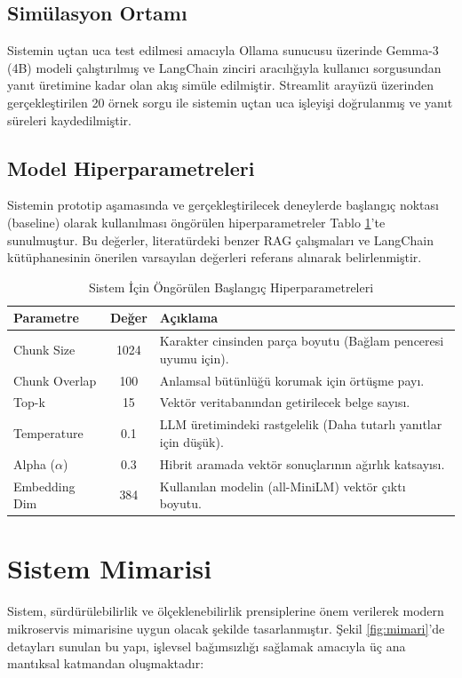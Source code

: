 \documentclass[12pt,a4paper]{report}
\begin{document}
\subsection{Simülasyon Ortamı}
Sistemin uçtan uca test edilmesi amacıyla Ollama sunucusu üzerinde Gemma-3 (4B) modeli çalıştırılmış ve LangChain zinciri aracılığıyla kullanıcı sorgusundan yanıt üretimine kadar olan akış simüle edilmiştir. Streamlit arayüzü üzerinden gerçekleştirilen 20 örnek sorgu ile sistemin uçtan uca işleyişi doğrulanmış ve yanıt süreleri kaydedilmiştir.

\subsection{Model Hiperparametreleri}
Sistemin prototip aşamasında ve gerçekleştirilecek deneylerde başlangıç noktası (baseline) olarak kullanılması öngörülen hiperparametreler Tablo \ref{tab:hyperparams}'te sunulmuştur. Bu değerler, literatürdeki benzer RAG çalışmaları ve LangChain kütüphanesinin önerilen varsayılan değerleri referans alınarak belirlenmiştir.

\begin{table}[H]
  \centering
  \caption{Sistem İçin Öngörülen Başlangıç Hiperparametreleri}
  \begin{tabular}{|l|c|l|}
    \hline
    \textbf{Parametre} & \textbf{Değer} & \textbf{Açıklama} \\
    \hline
    Chunk Size & 1024 & Karakter cinsinden parça boyutu (Bağlam penceresi uyumu için). \\
    Chunk Overlap & 100 & Anlamsal bütünlüğü korumak için örtüşme payı. \\
    Top-k & 15 & Vektör veritabanından getirilecek belge sayısı. \\
    Temperature & 0.1 & LLM üretimindeki rastgelelik (Daha tutarlı yanıtlar için düşük). \\
    Alpha ($\alpha$) & 0.3 & Hibrit aramada vektör sonuçlarının ağırlık katsayısı. \\
    Embedding Dim & 384 & Kullanılan modelin (all-MiniLM) vektör çıktı boyutu. \\
    \hline
  \end{tabular}
  \label{tab:hyperparams}
\end{table}

\newpage
\section{Sistem Mimarisi}
Sistem, sürdürülebilirlik ve ölçeklenebilirlik prensiplerine önem verilerek modern mikroservis mimarisine uygun olacak şekilde tasarlanmıştır. Şekil \ref{fig:mimari}'de detayları sunulan bu yapı, işlevsel bağımsızlığı sağlamak amacıyla üç ana mantıksal katmandan oluşmaktadır:
\end{document}
